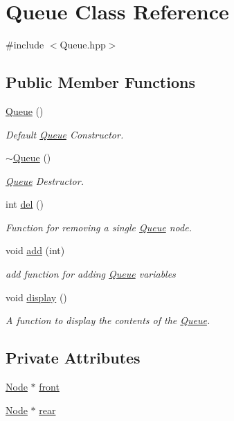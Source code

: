 \hypertarget{classQueue}{\section{\-Queue \-Class \-Reference}
\label{classQueue}
}


{\ttfamily \#include $<$\-Queue.\-hpp$>$}

\subsection*{\-Public \-Member \-Functions}
\begin{DoxyCompactItemize}
\item 
\hyperlink{classQueue_a7cfca3637d57c4a9e37351b3426ffd40}{\-Queue} ()
\begin{DoxyCompactList}\small\item\em \-Default \hyperlink{classQueue}{\-Queue} \-Constructor. \end{DoxyCompactList}\item 
\hyperlink{classQueue_a00d119db8fa3050da37746e82cbcf94f}{$\sim$\-Queue} ()
\begin{DoxyCompactList}\small\item\em \hyperlink{classQueue}{\-Queue} \-Destructor. \end{DoxyCompactList}\item 
int \hyperlink{classQueue_a45558a88b89e85086730b64efa4557f6}{del} ()
\begin{DoxyCompactList}\small\item\em \-Function for removing a single \hyperlink{classQueue}{\-Queue} node. \end{DoxyCompactList}\item 
void \hyperlink{classQueue_aff0f91402056fb26b1e10cef82f37887}{add} (int)
\begin{DoxyCompactList}\small\item\em add function for adding \hyperlink{classQueue}{\-Queue} variables \end{DoxyCompactList}\item 
void \hyperlink{classQueue_a3e0d42ab9a74d1c915fea58e4067e385}{display} ()
\begin{DoxyCompactList}\small\item\em \-A function to display the contents of the \hyperlink{classQueue}{\-Queue}. \end{DoxyCompactList}\end{DoxyCompactItemize}
\subsection*{\-Private \-Attributes}
\begin{DoxyCompactItemize}
\item 
\hyperlink{classNode}{\-Node} $\ast$ \hyperlink{classQueue_a36ab375d24d41bcc1d598c132700835b}{front}
\item 
\hyperlink{classNode}{\-Node} $\ast$ \hyperlink{classQueue_a9e7cf4e1319b62764653fdc67b649dd3}{rear}
\end{DoxyCompactItemize}


